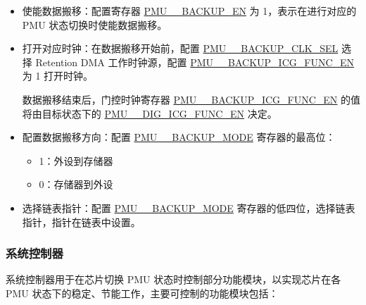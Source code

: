 \documentclass[main\_\_CN.tex]{subfiles}
\begin{document}
\begin{itemize}
    \item 使能数据搬移：配置寄存器 \hyperref[fielddesc:PMUHPSLEEP2ACTIVEBACKUPEN]{PMU\_\_BACKUP\_EN} 为 1，表示在进行对应的 PMU 状态切换时使能数据搬移。
    \item 打开对应时钟：在数据搬移开始前，配置 \hyperref[fielddesc:PMUHPMODEM2SLEEPBACKUPCLKSEL]{PMU\_\_BACKUP\_CLK\_SEL} 选择 Retention DMA 工作时钟源，配置 \hyperref[fielddesc:PMUHPACTIVEBACKUPICGFUNCEN]{PMU\_\_BACKUP\_ICG\_FUNC\_EN} 为 1 打开时钟。

    数据搬移结束后，门控时钟寄存器 \hyperref[fielddesc:PMUHPACTIVEBACKUPICGFUNCEN]{PMU\_\_BACKUP\_ICG\_FUNC\_EN} 的值将由目标状态下的 \hyperref[fielddesc:PMUHPACTIVEDIGICGFUNCEN]{PMU\_\_DIG\_ICG\_FUNC\_EN} 决定。

    \item 配置数据搬移方向：配置 \hyperref[fielddesc:PMUHPMODEM2SLEEPBACKUPMODE]{PMU\_\_BACKUP\_MODE} 寄存器的最高位：
        \begin{itemize}
            \item 1：外设到存储器
            \item 0：存储器到外设
        \end{itemize}

    \item 选择链表指针：配置 \hyperref[fielddesc:PMUHPMODEM2SLEEPBACKUPMODE]{PMU\_\_BACKUP\_MODE} 寄存器的低四位，选择链表指针，指针在链表中设置。
\end{itemize}

\subsubsection{系统控制器}

系统控制器用于在芯片切换 PMU 状态时控制部分功能模块，以实现芯片在各 PMU 状态下的稳定、节能工作，主要可控制的功能模块包括：
\end{document}
